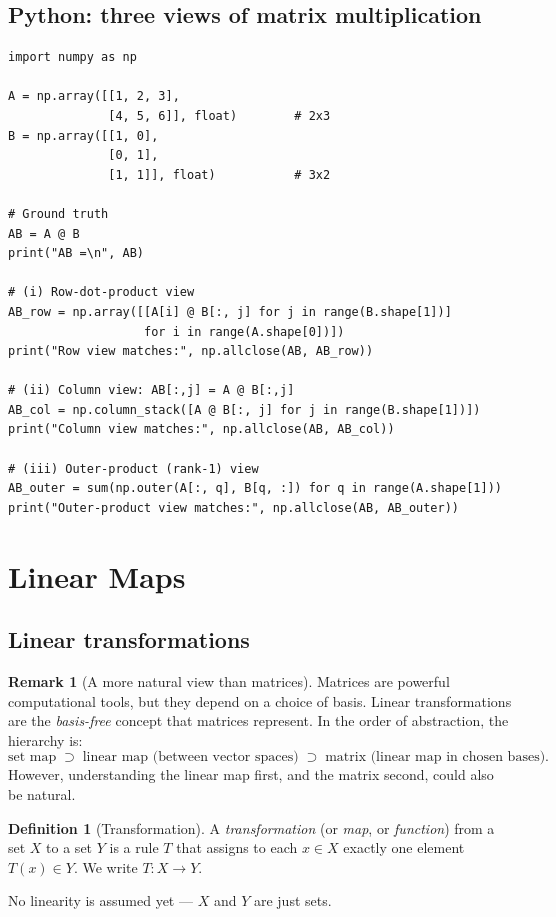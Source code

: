 \documentclass[11pt]{article}
\theoremstyle{definition}
\newtheorem{definition}{Definition}[section]
\newtheorem{remark}{Remark}[section]
\theoremstyle{plain}
\begin{document}
\subsection{Python: three views of matrix multiplication}
\begin{lstlisting}
import numpy as np

A = np.array([[1, 2, 3],
              [4, 5, 6]], float)        # 2x3
B = np.array([[1, 0],
              [0, 1],
              [1, 1]], float)           # 3x2

# Ground truth
AB = A @ B
print("AB =\n", AB)

# (i) Row-dot-product view
AB_row = np.array([[A[i] @ B[:, j] for j in range(B.shape[1])]
                   for i in range(A.shape[0])])
print("Row view matches:", np.allclose(AB, AB_row))

# (ii) Column view: AB[:,j] = A @ B[:,j]
AB_col = np.column_stack([A @ B[:, j] for j in range(B.shape[1])])
print("Column view matches:", np.allclose(AB, AB_col))

# (iii) Outer-product (rank-1) view
AB_outer = sum(np.outer(A[:, q], B[q, :]) for q in range(A.shape[1]))
print("Outer-product view matches:", np.allclose(AB, AB_outer))
\end{lstlisting}

\section{Linear Maps}

\subsection{Linear transformations}

\begin{remark}[A more natural view than matrices]
  Matrices are powerful computational tools, but they depend on a choice
  of basis.  Linear transformations are the \emph{basis-free} concept
  that matrices represent.  In the order of abstraction, the hierarchy is:
  \[
    \text{set map} \;\supset\;
    \text{linear map (between vector spaces)} \;\supset\;
    \text{matrix (linear map in chosen bases)}.
  \]
  However, understanding the linear map first, and the matrix second, could also be natural.
\end{remark}

\begin{definition}[Transformation]
  A \emph{transformation} (or \emph{map}, or \emph{function}) from a set
  $X$ to a set $Y$ is a rule $T$ that assigns to each $x\in X$ exactly
  one element $T(x)\in Y$.  We write $T:X\to Y$.

  No linearity is assumed yet --- $X$ and $Y$ are just sets.
\end{definition}
\end{document}
